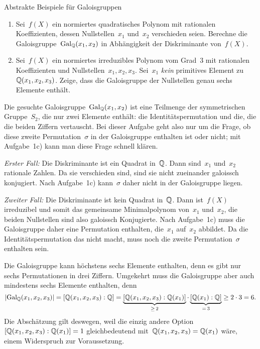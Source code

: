 \documentclass{algblatt}
\begin{document}
\begin{aufgabe}{Abstrakte Beispiele für Galoisgruppen}
\begin{enumerate}
\item Sei~$f(X)$ ein normiertes quadratisches Polynom mit rationalen
Koeffizienten, dessen Nullstellen~$x_1$ und~$x_2$ verschieden seien.
Berechne die Galoisgruppe~$\mathrm{Gal}_{\mathbb{Q}}(x_1,x_2)$ in Abhängigkeit der Diskriminante
von~$f(X)$.

\item Sei~$f(X)$ ein normiertes irreduzibles Polynom vom Grad~$3$ mit
rationalen Koeffizienten und Nullstellen~$x_1,x_2,x_3$. Sei~$x_1$ \emph{kein}
primitives Element zu~$\mathbb{Q}(x_1,x_2,x_3)$. Zeige, dass die Galoisgruppe der
Nullstellen genau sechs Elemente enthält.
\end{enumerate}

\begin{loesungE}
\item Die gesuchte Galoisgruppe~$\mathrm{Gal}_{\mathbb{Q}}(x_1,x_2)$ ist eine Teilmenge der
symmetrischen Gruppe~$S_2$, die nur zwei Elemente enthält: die
Identitätspermutation und die, die die beiden Ziffern vertauscht. Bei dieser
Aufgabe geht also nur um die Frage, ob diese zweite Permutation~$\sigma$ in der
Galoisgruppe enthalten ist oder nicht; mit Aufgabe~1c) kann man diese Frage
schnell klären.

\emph{Erster Fall:} Die Diskriminante ist ein Quadrat in~$\mathbb{Q}$. Dann sind~$x_1$
und~$x_2$ rationale Zahlen. Da sie verschieden sind, sind sie nicht zueinander
galoissch konjugiert. Nach Aufgabe~1c) kann~$\sigma$ daher nicht in der
Galoisgruppe liegen.

\emph{Zweiter Fall:} Die Diskriminante ist kein Quadrat in~$\mathbb{Q}$. Dann
ist~$f(X)$ irreduzibel und somit das gemeinsame Minimalpolynom von~$x_1$
und~$x_2$, die beiden Nullstellen sind also galoissch Konjugierte. Nach
Aufgabe~1c) muss die Galoisgruppe daher eine Permutation enthalten, die~$x_1$
auf~$x_2$ abbildet. Da die Identitätspermutation das nicht macht, muss noch
die zweite Permutation~$\sigma$ enthalten sein.

\item Die Galoisgruppe kann höchstens sechs Elemente enthalten, denn es gibt
nur sechs Permutationen in drei Ziffern. Umgekehrt muss die Galoisgruppe aber
auch mindestens sechs Elemente enthalten, denn
\[ |\mathrm{Gal}_{\mathbb{Q}}(x_1,x_2,x_3)| = [\mathbb{Q}(x_1,x_2,x_3):\mathbb{Q}] =
  \underbrace{[\mathbb{Q}(x_1,x_2,x_3):\mathbb{Q}(x_1)]}_{\geq\,2} \cdot
  \underbrace{[\mathbb{Q}(x_1):\mathbb{Q}]}_{=\,3} \geq
  2 \cdot 3 = 6. \]
Die Abschätzung gilt deswegen, weil die einzig andere
Option~$[\mathbb{Q}(x_1,x_2,x_3):\mathbb{Q}(x_1)] = 1$ gleichbedeutend
mit~$\mathbb{Q}(x_1,x_2,x_3) = \mathbb{Q}(x_1)$ wäre, einem Widerspruch zur Voraussetzung.
\end{loesungE}
\end{aufgabe}
\end{document}
